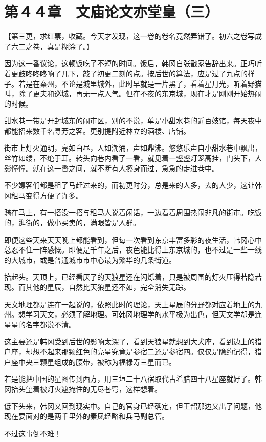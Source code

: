 \section{第４４章　文庙论文亦堂皇（三）}

【第三更，求红票，收藏。今天才发现，这一卷的卷名竟然弄错了。初六之卷写成了六二之卷，真是糊涂了。】

因为这一番议论，这顿饭吃了不短的时间。饭后，韩冈自张戬家告辞出来。正巧听着更鼓咚咚咚响了几下，敲了初更二刻的点。按后世的算法，应是过了九点的样子。若是在秦州，不论是城里城外，此时早就是一片黑了，看着星月光，听着野猫叫，除了更夫和巡城，再无一点人气。但在不夜的东京城，现在才是刚刚开始热闹的时候。

甜水巷一带是开封城东的闹市区，别的不说，单是小甜水巷的近百妓馆，每天夜中都能招来数千名寻芳之客。更别提附近林立的酒楼、店铺。

街市上灯火通明，亮如白昼，人如潮涌，声如鼎沸。悠悠乐声自小甜水巷中飘出，丝竹如缕，不绝于耳。转头向巷内看了一看，就见着一盏盏灯笼高挂，门头下，人影憧憧。就在这一瞥之间，就不断有人擦身而过，急急的走进巷中。

不少嫖客们都是租了马赶过来的，而初更时分，总是来的人多，去的人少，这让韩冈租马变得方便了许多。

骑在马上，有一搭没一搭与租马人说着闲话，一边看着周围热闹非凡的街市。吃饭的，逛街的，做小买卖的，满眼皆是人群。

即便这些天来天天晚上都能看到，但每一次看到东京丰富多彩的夜生活，韩冈心中总忍不住一阵感慨。即便是千年之后，夜色能比得上东京城的，也不过是一些一线的大城市，或是普通城市市中心最为繁华的几条街道。

抬起头。天顶上，已经看厌了的天狼星还在闪烁着，只是被周围的灯火压得若隐若现。而其他的星辰，自然比天狼星还不如，完全消失无踪。

天文地理都是连在一起说的，依照此时的理论，天上星辰的分野都对应着地上的九州。想学习天文，必须了解地理。可韩冈地理学的水平极为出色，但天文学却是连星星的名字都说不清。

这主要还是韩冈受到后世的影响太深了，看到天狼星就想到大犬座，看到边上的猎户座，却想不起来那颗红色的亮星究竟是参宿二还是参宿四。仅仅是隐约记得，猎户座中央三颗星组成的腰带，被称为福禄寿三星而已。

若是能把中国的星图传到西方，用三垣二十八宿取代古希腊四十八星座就好了。韩冈抬头望着被灯火遮掩住的无尽苍穹，这样想着。

低下头来，韩冈又回到现实中。自己的官身已经确定，但王韶那边又出了问题，他现在要面对的是两千里外的秦凤经略和兵马副总管。

不过这事倒不难！

